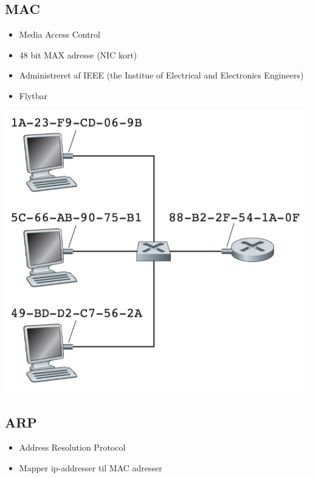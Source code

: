 \subsection{MAC}
\begin{itemize}
	\item Media Access Control
	\item 48 bit MAX adresse (NIC kort)
	\item Administreret af IEEE (the Institue of Electrical and Electronics Engineers)
	\item Flytbar
\end{itemize}

{\includegraphics{5-data-link-layer/mac.png}

\subsection{ARP}
\begin{itemize}
	\item Address Resolution Protocol
	\item Mapper ip-addresser til MAC adresser
\end{itemize}

}
